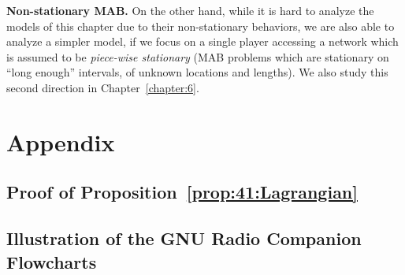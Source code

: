 

\textbf{Non-stationary MAB.}
%
On the other hand, while it is hard to analyze the models of this chapter due to their non-stationary behaviors, we are also able to analyze a simpler model, if we focus on a single player accessing a network which is assumed to be \emph{piece-wise stationary}
(MAB problems which are stationary on ``long enough'' intervals, of unknown locations and lengths).
%
We also study this second direction in Chapter~\ref{chapter:6}.


\newpage
\section{Appendix}
\label{sec:4:appendix}

\subsection{Proof of Proposition~\ref{prop:41:Lagrangian}}
\label{sec:4:proofLagrangian}





\newpage
\subsection{Illustration of the GNU Radio Companion Flowcharts}
\label{sec:4:IllustrationFlowcharts}


